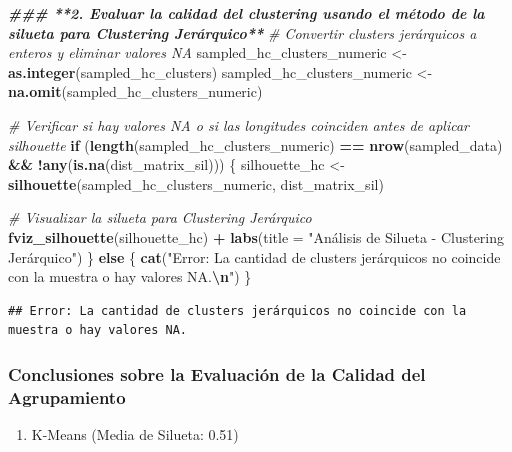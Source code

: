 \documentclass[
]{article}
\newenvironment{Shaded}{\begin{snugshade}}{\end{snugshade}}
\newcommand{\AttributeTok}[1]{\textcolor[rgb]{0.13,0.29,0.53}{#1}}
\newcommand{\CommentTok}[1]{\textcolor[rgb]{0.56,0.35,0.01}{\textit{#1}}}
\newcommand{\ControlFlowTok}[1]{\textcolor[rgb]{0.13,0.29,0.53}{\textbf{#1}}}
\newcommand{\DocumentationTok}[1]{\textcolor[rgb]{0.56,0.35,0.01}{\textbf{\textit{#1}}}}
\newcommand{\FunctionTok}[1]{\textcolor[rgb]{0.13,0.29,0.53}{\textbf{#1}}}
\newcommand{\NormalTok}[1]{#1}
\newcommand{\OtherTok}[1]{\textcolor[rgb]{0.56,0.35,0.01}{#1}}
\newcommand{\SpecialCharTok}[1]{\textcolor[rgb]{0.81,0.36,0.00}{\textbf{#1}}}
\newcommand{\StringTok}[1]{\textcolor[rgb]{0.31,0.60,0.02}{#1}}
\providecommand{\tightlist}{%
  \setlength{\itemsep}{0pt}\setlength{\parskip}{0pt}}
\begin{document}
\begin{Shaded}
\begin{Highlighting}[]
\DocumentationTok{\#\#\# **2. Evaluar la calidad del clustering usando el método de la silueta para Clustering Jerárquico**}
\CommentTok{\# Convertir clusters jerárquicos a enteros y eliminar valores NA}
\NormalTok{sampled\_hc\_clusters\_numeric }\OtherTok{\textless{}{-}} \FunctionTok{as.integer}\NormalTok{(sampled\_hc\_clusters)}
\NormalTok{sampled\_hc\_clusters\_numeric }\OtherTok{\textless{}{-}} \FunctionTok{na.omit}\NormalTok{(sampled\_hc\_clusters\_numeric)}

\CommentTok{\# Verificar si hay valores NA o si las longitudes coinciden antes de aplicar silhouette}
\ControlFlowTok{if}\NormalTok{ (}\FunctionTok{length}\NormalTok{(sampled\_hc\_clusters\_numeric) }\SpecialCharTok{==} \FunctionTok{nrow}\NormalTok{(sampled\_data) }\SpecialCharTok{\&\&} \SpecialCharTok{!}\FunctionTok{any}\NormalTok{(}\FunctionTok{is.na}\NormalTok{(dist\_matrix\_sil))) \{}
\NormalTok{  silhouette\_hc }\OtherTok{\textless{}{-}} \FunctionTok{silhouette}\NormalTok{(sampled\_hc\_clusters\_numeric, dist\_matrix\_sil)}

  \CommentTok{\# Visualizar la silueta para Clustering Jerárquico}
  \FunctionTok{fviz\_silhouette}\NormalTok{(silhouette\_hc) }\SpecialCharTok{+}
    \FunctionTok{labs}\NormalTok{(}\AttributeTok{title =} \StringTok{"Análisis de Silueta {-} Clustering Jerárquico"}\NormalTok{)}
\NormalTok{\} }\ControlFlowTok{else}\NormalTok{ \{}
  \FunctionTok{cat}\NormalTok{(}\StringTok{"Error: La cantidad de clusters jerárquicos no coincide con la muestra o hay valores NA.}\SpecialCharTok{\textbackslash{}n}\StringTok{"}\NormalTok{)}
\NormalTok{\}}
\end{Highlighting}
\end{Shaded}

\begin{verbatim}
## Error: La cantidad de clusters jerárquicos no coincide con la muestra o hay valores NA.
\end{verbatim}

\subsubsection{Conclusiones sobre la Evaluación de la Calidad del
Agrupamiento}\label{conclusiones-sobre-la-evaluaciuxf3n-de-la-calidad-del-agrupamiento}

\begin{enumerate}
\def\labelenumi{\arabic{enumi}.}
\tightlist
\item
  K-Means (Media de Silueta: 0.51)
\end{enumerate}
\end{document}
